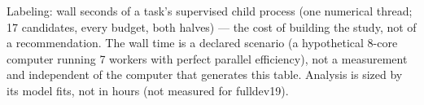 \begin{table}[htbp]
\par\vspace{0.5em}
\begin{minipage}{0.97\linewidth}
\footnotesize Labeling: wall seconds of a task's supervised child process (one numerical thread; 17 candidates, every budget, both halves) --- the cost of building the study, not of a recommendation. The wall time is a declared scenario (a hypothetical 8-core computer running 7 workers with perfect parallel efficiency), not a measurement and independent of the computer that generates this table. Analysis is sized by its model fits, not in hours (not measured for fulldev19).
\end{minipage}
\end{table}

